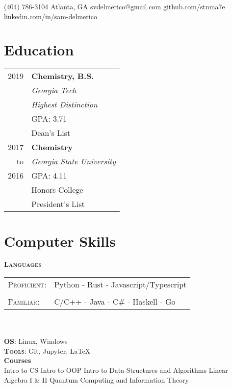 \documentclass{tccv}
\begin{document}
    {(404) 786-3104}
    {Atlanta, GA}
    {}
    {svdelmerico@gmail.com}
    {github.com/stnma7e}
    {linkedin.com/in/sam-delmerico}

\small

\begin{minipage}[t]{0.35\textwidth}
    \section{Education}
    \begin{tabular}{rl}
        2019 & \textbf{Chemistry, B.S.} \\
             & \emph{Georgia Tech} \\
             & \emph{Highest Distinction} \\
             & GPA: 3.71 \\
             & Dean's List \\
        
        2017 & \textbf{Chemistry} \\
        to   & \emph{Georgia State University} \\
        2016 & GPA: 4.11 \\
             & Honors College \\
             & President's List
    \end{tabular}

    \section{Computer Skills}
    \textbf{\textsc{Languages}}
  
    \begin{tabulary}{\linewidth}{lL}
        \textsc{Proficient:} & Python - Rust - Javascript/Typescript \\
        \\
        \textsc{Familiar:} &  C/C++ - Java - C\# - Haskell - Go
    \end{tabulary}
    \\\\
    
    \textbf{\textsc{OS}}:
        Linux, Windows \\
   
    \textbf{\textsc{Tools}}:
        Git, Jupyter, \LaTeX{} \\
    
    \textbf{Courses} \\
        Intro to CS \newline
        Intro to OOP \newline
        Intro to Data Structures and Algorithms \newline
        Linear Algebra I \& II \newline
        Quantum Computing and Information Theory
        

\end{minipage}
\end{document}
